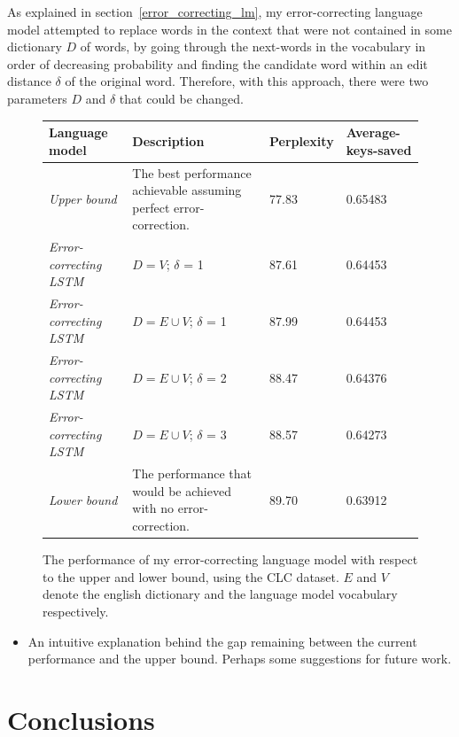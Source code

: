 \documentclass[a4paper, 12pt]{report}
\newcommand{\tbf}[1]{\textbf{#1}}
\newcommand{\tit}[1]{\textit{#1}}
\begin{document}
As explained in section~\ref{error_correcting_lm}, my error-correcting language model attempted to replace words in the context that were not contained in some dictionary $D$ of words, by going through the next-words in the vocabulary in order of decreasing probability and finding the candidate word within an edit distance $\delta$ of the original word. Therefore, with this approach, there were two parameters $D$ and $\delta$ that could be changed.

\begin{figure}[h]
\captionsetup{justification=centering}
\begin{adjustbox}{center}
\begin{tabular}{| L{3.5cm} | L{8cm} | C{2.2cm} | C{2cm} |}
	\hline
	\tbf{Language model} & \tbf{Description} & \tbf{Perplexity} & \tbf{Average-keys-saved} \\ \hline
	\tit{Upper bound} & The best performance achievable assuming perfect error-correction. & 77.83 & 0.65483 \\ \hline
	\tit{Error-correcting LSTM} & $D = V$; $\delta$ = 1 & 87.61 & 0.64453 \\ \hline
	\tit{Error-correcting LSTM} & $D = E \cup V$; $\delta$ = 1 & 87.99 & 0.64453 \\ \hline
	\tit{Error-correcting LSTM} & $D = E \cup V$; $\delta$ = 2 & 88.47 & 0.64376 \\ \hline
	\tit{Error-correcting LSTM} & $D = E \cup V$; $\delta$ = 3 & 88.57 & 0.64273 \\ \hline
	\tit{Lower bound} & The performance that would be achieved with no error-correction. & 89.70 & 0.63912 \\ \hline
\end{tabular}
\end{adjustbox}
\caption{The performance of my error-correcting language model with respect to the upper and lower bound, using the CLC dataset. $E$ and $V$ denote the english dictionary and the language model vocabulary respectively.}
\label{fig:error_correcting_results}
\end{figure}

\begin{itemize}
\item
	An intuitive explanation behind the gap remaining between the current performance and the upper bound. Perhaps some suggestions for future work.
\end{itemize}


\chapter{Conclusions}
\end{document}
